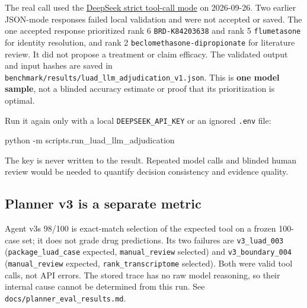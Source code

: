 \documentclass[
  10pt,
]{ctexart}
\newenvironment{Shaded}{}{}
\newcommand{\FunctionTok}[1]{\textcolor[rgb]{0.02,0.16,0.49}{#1}}
\newcommand{\NormalTok}[1]{#1}
\newcommand{\OperatorTok}[1]{\textcolor[rgb]{0.40,0.40,0.40}{#1}}
\begin{document}
The real call used the
\href{https://api-docs.deepseek.com/guides/tool_calls/}{DeepSeek strict
tool-call mode} on 2026-09-26. Two earlier JSON-mode responses failed
local validation and were not accepted or saved. The one accepted
response prioritized rank 6 \texttt{BRD-K84203638} and rank 5
\texttt{flumetasone} for identity resolution, and rank 2
\texttt{beclomethasone-dipropionate} for literature review. It did not
propose a treatment or claim efficacy. The validated output and input
hashes are saved in
\texttt{benchmark/\allowbreak{}results/\allowbreak{}luad\_\allowbreak{}llm\_\allowbreak{}adjudication\_\allowbreak{}v1.\allowbreak{}json}. This is
\textbf{one model sample}, not a blinded accuracy estimate or proof that
its prioritization is optimal.

Run it again only with a local \texttt{DEEPSEEK\_\allowbreak{}API\_\allowbreak{}KEY} or an ignored
\texttt{.\allowbreak{}env} file:

\begin{Shaded}
\begin{Highlighting}[]
\NormalTok{python }\OperatorTok{{-}}\NormalTok{m scripts}\OperatorTok{.}\FunctionTok{run\_luad\_llm\_adjudication}
\end{Highlighting}
\end{Shaded}

The key is never written to the result. Repeated model calls and blinded
human review would be needed to quantify decision consistency and
evidence quality.

\subsection{Planner v3 is a separate
metric}\label{planner-v3-is-a-separate-metric}

Agent v3\textquotesingle s 98/100 is exact-match selection of the
expected tool on a frozen 100-case set; it does not grade drug
predictions. Its two failures are \texttt{v3\_\allowbreak{}luad\_\allowbreak{}003}
(\texttt{package\_\allowbreak{}luad\_\allowbreak{}case} expected, \texttt{manual\_\allowbreak{}review}
selected) and \texttt{v3\_\allowbreak{}boundary\_\allowbreak{}004} (\texttt{manual\_\allowbreak{}review}
expected, \texttt{rank\_\allowbreak{}transcriptome} selected). Both were valid tool
calls, not API errors. The stored trace has no raw model reasoning, so
their internal cause cannot be determined from this run. See
\texttt{docs/\allowbreak{}planner\_\allowbreak{}eval\_\allowbreak{}results.\allowbreak{}md}.
\end{document}

